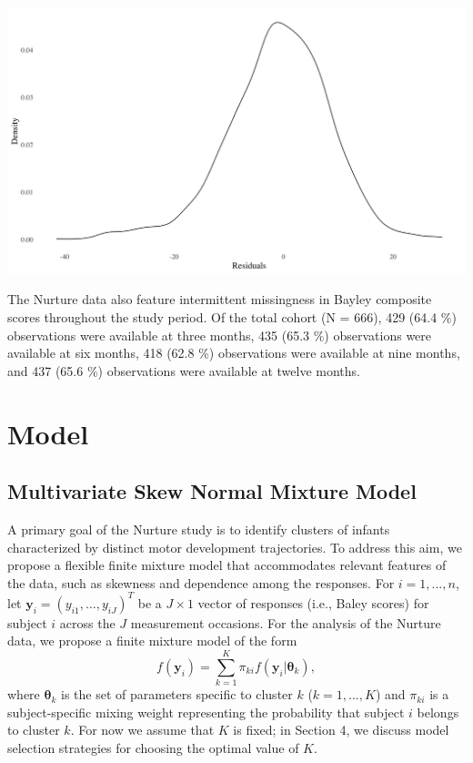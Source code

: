 \documentclass[useAMS,referee]{biom}
\let\origfigure\figure
\let\endorigfigure\endfigure
\renewenvironment{figure}[1][2] {
    \expandafter\origfigure\expandafter[H]
} {
    \endorigfigure
}
\begin{document}
\vspace{1mm}
\begin{figure}[h]
	\label{fig:skew_resids}
	\caption{The distribution of residuals in repeates measures regression model of Bayley composite scores adjusted for race and sex.}
	\centering
	\includegraphics[scale = 0.14]{bayley_resids_plot}
\end{figure}

The Nurture data also feature intermittent missingness in Bayley composite scores throughout the study period. Of the total cohort (N = 666), 429 (64.4 \%) observations were available at three months, 435 (65.3 \%) observations were available at six months, 418 (62.8 \%) observations were available at nine months, and 437 (65.6 \%) observations were available at twelve months. 


\section{Model}
\label{s:model}

\subsection{Multivariate Skew Normal Mixture Model}

A primary goal of the Nurture study is to identify clusters of infants characterized by distinct motor development trajectories. To address this aim, we propose a flexible finite mixture model that accommodates relevant features of the data, such as skewness and dependence among the responses. For $i = 1,...,n$, let $\mathbf{y}_{i}=(y_{i1},\ldots,y_{iJ})^T$ be a $J \times 1$ vector of responses (i.e., Baley scores) for subject $i$ across the $J$ measurement occasions. For the analysis of the Nurture data, we propose a finite mixture model of the form
\begin{equation}
f(\mathbf{y}_i) = \sum_{k = 1}^{K} \pi_{ki} f(\mathbf{y}_i|\boldsymbol\theta_k),
\end{equation}
where $\boldsymbol\theta_k$ is the set of parameters specific to cluster $k$ ($k = 1,...,K$) and $\pi_{ki}$ is a subject-specific mixing weight representing the probability that subject $i$ belongs to cluster $k$. For now we assume that $K$ is fixed; in Section 4, we discuss model selection strategies for choosing the optimal value of $K$. 
\end{document}
